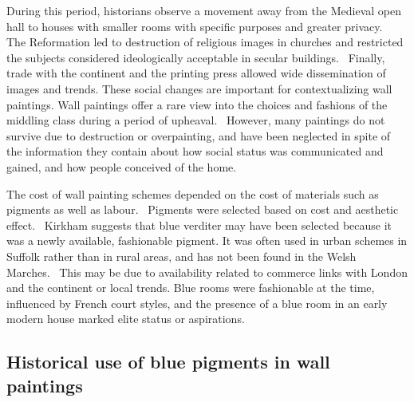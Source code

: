 During this period, historians observe a movement away from the Medieval open hall to houses with smaller rooms with specific purposes and greater privacy.~\autocite{Baird_thesis,Davies_book,Hamling_book} The Reformation led to destruction of religious images in churches and restricted the subjects considered ideologically acceptable in secular buildings.~\autocite{Kirkham_thesis,Hamling_book,Giles} Finally, trade with the continent and the printing press allowed wide dissemination of images and trends. These social changes are important for contextualizing wall paintings. Wall paintings offer a rare view into the choices and fashions of the middling class during a period of upheaval.~\autocite{Kirkham_thesis,Baird_thesis} However, many paintings do not survive due to destruction or overpainting, and have been neglected in spite of the information they contain about how social status was communicated and gained, and how people conceived of the home.~\autocite{Benton1,Benton2,Kirkham_thesis}


The cost of wall painting schemes depended on the cost of materials such as pigments as well as labour.~\autocite{Baird_thesis,Davies_book,Kirkham_thesis} Pigments were selected based on cost and aesthetic effect.~\autocite{Kirkham_thesis} Kirkham suggests that blue verditer may have been selected because it was a newly available, fashionable pigment. It was often used in urban schemes in Suffolk rather than in rural areas, and has not been found in the Welsh Marches.~\autocite{Kirkham_thesis,Baird_thesis} This may be due to availability related to commerce links with London and the continent or local trends. Blue rooms were fashionable at the time, influenced by French court styles, and the presence of a blue room in an early modern house marked elite status or aspirations.~\autocite{Kirkham_thesis}

\subsection[Historical use of blue pigments in wall paintings]{Historical use of blue pigments in wall paintings}
\label{subsection1.1.3}

